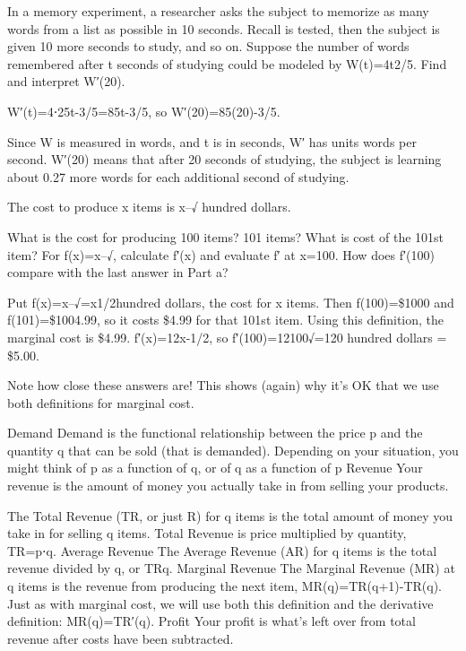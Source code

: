 \begin{example}
In a memory experiment, a researcher asks the subject to memorize as many words from a list as possible in 10 seconds. Recall is tested, then the subject is given 10 more seconds to study, and so on. Suppose the number of words remembered after t seconds of studying could be modeled by W(t)=4t2/5. Find and interpret W′(20).

\begin{solution} W′(t)=4⋅25t-3/5=85t-3/5, so W′(20)=85(20)-3/5.

Since W is measured in words, and t is in seconds, W′ has units words per second. W′(20) means that after 20 seconds of studying, the subject is learning about 0.27 more words for each additional second of studying.
\end{solution}\end{example}



\begin{example}
  \label{ex:2-7-11}
The cost to produce x items is x--√ hundred dollars.

What is the cost for producing 100 items? 101 items? What is cost of the 101st item?
For f(x)=x--√, calculate f′(x) and evaluate f′ at x=100. How does f′(100) compare with the last answer in Part a?
\begin{solution} Put f(x)=x--√=x1/2hundred dollars, the cost for x items. Then f(100)=\$1000 and f(101)=\$1004.99, so it costs \$4.99 for that 101st item. Using this definition, the marginal cost is \$4.99.
f′(x)=12x-1/2, so f′(100)=12100√=120 hundred dollars = \$5.00.
\end{solution}\end{example}

Note how close these answers are! This shows (again) why it’s OK that we use both definitions for marginal cost.

Demand
Demand is the functional relationship between the price p and the quantity q that can be sold (that is demanded). Depending on your situation, you might think of p as a function of q, or of q as a function of p
Revenue
Your revenue is the amount of money you actually take in from selling your products.

The Total Revenue (TR, or just R) for q items is the total amount of money you take in for selling q items. Total Revenue is price multiplied by quantity,
TR=p⋅q.
Average Revenue
The Average Revenue (AR) for q items is the total revenue divided by q, or
TRq.
Marginal Revenue
The Marginal Revenue (MR) at q items is the revenue from producing the next item,
MR(q)=TR(q+1)-TR(q).
Just as with marginal cost, we will use both this definition and the derivative definition:
MR(q)=TR′(q).
Profit
Your profit is what’s left over from total revenue after costs have been subtracted.

